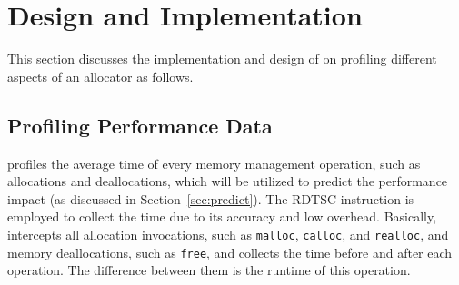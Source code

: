 \section{Design and Implementation}
\label{sec:implementation}

This section discusses the implementation and design of \MP{} on profiling different aspects of an allocator as follows. 


\subsection{Profiling Performance Data}

\label{sec:performanceimplement}

\MP{} profiles the average time of every memory management operation, such as allocations and deallocations, which will be utilized to predict the performance impact (as discussed in Section~\ref{sec:predict}). The RDTSC instruction is employed to collect the time due to its accuracy and low overhead. Basically, \MP{} intercepts all allocation invocations, such as \texttt{malloc}, \texttt{calloc}, and \texttt{realloc}, and memory deallocations, such as \texttt{free}, and collects the time before and after each operation. The difference between them is the runtime of this operation.  

